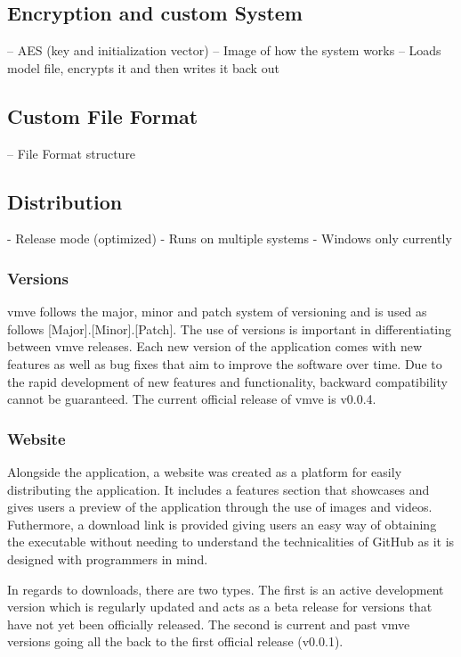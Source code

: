 \documentclass[11pt]{article}
\begin{document}
\subsection{Encryption and custom System}

-- AES (key and initialization vector)
-- Image of how the system works 
  -- Loads model file, encrypts it and then writes it back out


\subsection{Custom File Format}
-- File Format structure



\subsection{Distribution}
- Release mode (optimized)
- Runs on multiple systems
- Windows only currently

\subsubsection{Versions}
\gls{vmve} follows the major, minor and patch system of versioning and is used
as follows [Major].[Minor].[Patch]. The use of versions is important in
differentiating between \gls{vmve} releases. Each new version of the application
comes with new features as well as bug fixes that aim to improve the software
over time. Due to the rapid development of new features and functionality,
backward compatibility cannot be guaranteed. The current official release of
\gls{vmve} is v0.0.4.

\subsubsection{Website}
Alongside the application, a website was created as a platform for easily
distributing the application. It includes a features section that showcases and
gives users a preview of the application through the use of images and videos.
Futhermore, a download link is provided giving users an easy way of obtaining
the executable without needing to understand the technicalities of GitHub as it
is designed with programmers in mind.

In regards to downloads, there are two types. The first is an active development
version which is regularly updated and acts as a beta release for versions that
have not yet been officially released. The second is current and past \gls{vmve} versions
going all the back to the first official release (v0.0.1).
\end{document}
